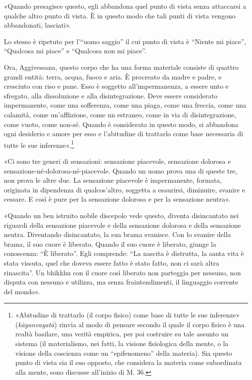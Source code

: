 «Quando presagisce questo, egli abbandona quel punto di vista senza attaccarsi a
qualche altro punto di vista. È in questo modo che tali punti di vista vengono
abbandonati, lasciati».

 Lo stesso è ripetuto per l’“uomo saggio” il cui
punto di vista è “Niente mi piace”, “Qualcosa mi piace” e “Qualcosa non mi
piace”.

 Ora, Aggivessana, questo corpo che ha una forma materiale
consiste di quattro grandi entità: terra, acqua, fuoco e aria. È procreato da
madre e padre, e cresciuto con riso e pane. Esso è soggetto all’impermanenza, a
essere unto e sfregato, alla dissoluzione e alla disintegrazione. Deve essere
considerato impermanente, come una sofferenza, come una piaga, come una freccia,
come una calamità, come un’afflizione, come un estraneo, come in via di
disintegrazione, come vuoto, come non-sé. Quando è considerato in questo modo,
si abbandona ogni desiderio e amore per esso e l’abitudine di trattarlo come
base necessaria di tutte le sue inferenze».\footnote{«Abitudine di trattarlo (il
  corpo fisico) come base di tutte le sue inferenze» (\emph{kāyanvayatā}) rinvia
  al modo di pensare secondo il quale il corpo fisico è una realtà basilare, una
  verità empirica, per poi costruire su tale assunto un sistema (il
  materialismo, nei fatti, la visione fisiologica della mente, o la visione
  della coscienza come un “epifenomeno” della materia). Sia questo punto di
  vista sia il suo opposto, che considera la materia come subordinata alla
  mente, sono discusse all’inizio di M. 36.}

«Ci sono tre generi di sensazioni: sensazione piacevole, sensazione dolorosa e
sensazione-né-dolorosa-né-piacevole. Quando un uomo prova una di queste tre, non
prova le altre due. La sensazione piacevole è impermanente, formata, originata
in dipendenza di qualcos’altro, soggetta a esaurirsi, diminuire, svanire e
cessare. E così è pure per la sensazione dolorosa e per la sensazione neutra».

«Quando un ben istruito nobile discepolo vede questo, diventa disincantato nei
riguardi della sensazione piacevole e della sensazione dolorosa e della
sensazione neutra. Diventando disincantato, la sua brama svanisce. Con lo
svanire della brama, il suo cuore è liberato. Quando il suo cuore è liberato,
giunge la conoscenza: “È liberato”. Egli comprende: “La nascita è distrutta, la
santa vita è stata vissuta, quel che doveva essere fatto è stato fatto, non ci
sarà altra rinascita”. Un bhikkhu con il cuore così liberato non parteggia per
nessuno, non disputa con nessuno e utilizza, ma senza fraintendimenti, il
linguaggio corrente del mondo».


